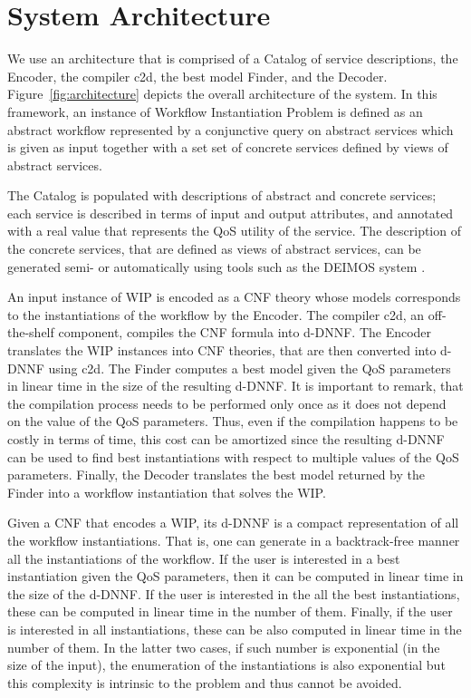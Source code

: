 \documentclass{llncs}
\begin{document}
\section{System Architecture}

We use an architecture that is comprised of a Catalog of service descriptions,
the Encoder, the compiler c2d, the best model Finder, and the Decoder.
Figure~\ref{fig:architecture} depicts the overall architecture of the system.
In this framework, an instance of Workflow Instantiation Problem is defined as an
abstract workflow represented by a conjunctive query on abstract services which
is given as input together with a set set of concrete services defined by views
of abstract services. 

The Catalog is populated with descriptions of abstract and concrete services;
each service is described in terms of input and output attributes, and annotated
with a real value that represents the QoS utility of the service.
The description of the concrete services, that are defined as views of abstract
services, can be generated semi- or automatically using tools such as the DEIMOS
system \cite{AmbiteISWC09}. 

An input instance of WIP is encoded as a CNF theory whose models corresponds to
the instantiations of the workflow by the Encoder. The compiler c2d, an off-the-shelf
component, compiles the CNF formula into d-DNNF.
The Encoder translates the WIP instances into CNF theories, that are then converted
into d-DNNF using c2d. The Finder computes a best model given the QoS parameters
in linear time in the size of the resulting d-DNNF. It is important to remark,
that the compilation process needs to be performed only once as it does not
depend on the value of the QoS parameters. Thus, even if the compilation happens
to be costly in terms of time, this cost can be amortized since the resulting
d-DNNF can be used to find best instantiations with respect to multiple values
of the QoS parameters.
Finally, the Decoder translates the best model returned by the Finder into
a workflow instantiation that solves the WIP.

Given a CNF that encodes a WIP, its d-DNNF is a compact representation of
all the workflow instantiations. That is, one can generate in a backtrack-free
manner all the instantiations of the workflow. If the user is interested in
a best instantiation given the QoS parameters, then it can be computed in
linear time in the size of the d-DNNF. If the user is interested in the 
all the best instantiations, these can be computed in linear time in the
number of them. Finally, if the user is interested in all instantiations,
these can be also computed in linear time in the number of them.
In the latter two cases, if such number is exponential (in the size of the
input), the enumeration of the instantiations is also exponential but
this complexity is intrinsic to the problem and thus cannot be avoided.
\end{document}
